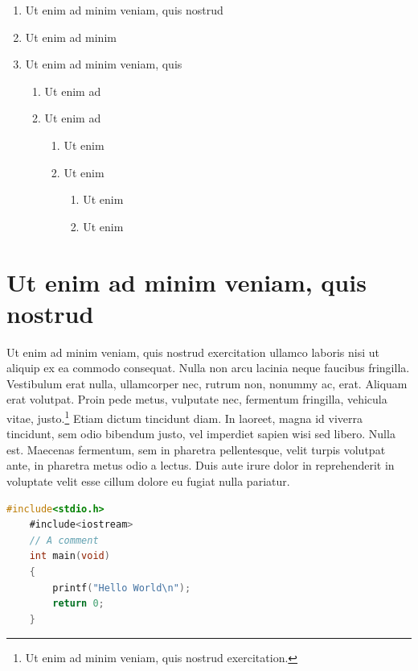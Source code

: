 \lipsum[6-7]

\begin{enumerate}
    \item Ut enim ad minim veniam, quis nostrud
    \item Ut enim ad minim 
    \item Ut enim ad minim veniam, quis 
    \begin{enumerate}
        \item Ut enim ad
        \item Ut enim ad
        \begin{enumerate}
            \item Ut enim 
            \item Ut enim 
            \begin{enumerate}
            \item Ut enim 
            \item Ut enim 
        \end{enumerate}
        \end{enumerate}
    \end{enumerate}
\end{enumerate}


\section{Ut enim ad minim veniam, quis nostrud}

Ut enim ad minim veniam, quis nostrud exercitation ullamco laboris nisi ut aliquip ex ea commodo consequat. Nulla non arcu lacinia neque faucibus fringilla. Vestibulum erat nulla, ullamcorper nec, rutrum non, nonummy ac, erat. Aliquam erat volutpat. Proin pede metus, vulputate nec, fermentum fringilla, vehicula vitae, justo.\footnote{Ut enim ad minim veniam, quis nostrud exercitation.} Etiam dictum tincidunt diam. In laoreet, magna id viverra tincidunt, sem odio bibendum justo, vel imperdiet sapien wisi sed libero. Nulla est. Maecenas fermentum, sem in pharetra pellentesque, velit turpis volutpat ante, in pharetra metus odio a lectus. Duis aute irure dolor in reprehenderit in voluptate velit esse cillum dolore eu fugiat nulla pariatur. 

\begin{lstlisting}[caption={~Zbytečný kód},label=list:8-6,captionpos=t,float,abovecaptionskip=-\medskipamount,belowcaptionskip=\medskipamount,language=C]
    #include<stdio.h>
    #include<iostream>
    // A comment
    int main(void)
    {
        printf("Hello World\n");
        return 0;
    }
\end{lstlisting}

